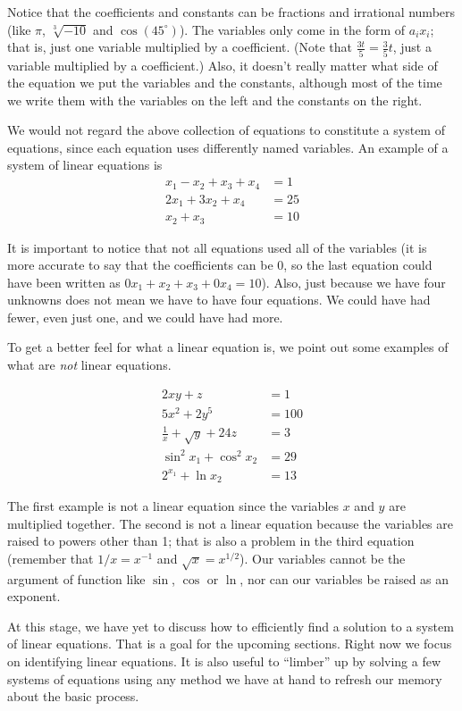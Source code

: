 Notice that the coefficients and constants can be fractions and irrational numbers (like $\pi$, $\sqrt[3]{-10}$ and $\cos(45^\circ)$). The variables only come in the form of $a_ix_i$; that is, just one variable multiplied by a coefficient. (Note that $\frac{3t}{5} = \frac35t$, just a variable multiplied by a coefficient.) Also, it doesn't really matter what side of the equation we put the variables and the constants, although most of the time we write them with the variables on the left and the constants on the right. 

We would not regard the above collection of equations to constitute a system of equations, since each equation uses differently named variables. An example of a system of linear equations is 
\begin{align*}
x_1-x_2+x_3+x_4&=1\\
2x_1+3x_2+x_4 &= 25\\
x_2+x_3&=10
\end{align*}

It is important to notice that not all equations used all of the variables (it is more accurate to say that the coefficients can be 0, so the last equation could have been written as $0x_1+x_2+x_3+0x_4 = 10$). Also, just because we have four unknowns does not mean we have to have four equations. We could have had fewer, even just one, and we could have had more.

To get a better feel for what a linear equation is, we point out some examples of what are {\em not} linear equations.

\begin{align*}
2xy+z&=1\\
5x^2+2y^5&=100\\
\frac1x+\sqrt{y}+24z&=3\\
\sin^2x_1+\cos^2x_2 &= 29\\
2^{x_1} + \ln x_2 &= 13
\end{align*}

The first example is not a linear equation since the variables $x$ and $y$ are multiplied together. The second is not a linear equation because the variables are raised to powers other than 1; that is also a problem in the third equation (remember that $1/x = x^{-1}$ and $\sqrt{x} = x^{1/2}$). Our variables cannot be the argument of function like $\sin$, $\cos$ or $\ln$, nor can our variables be raised as an exponent. 

At this stage, we have yet to discuss how to efficiently find a solution to a system of linear equations. That is a goal for the upcoming sections. Right now we focus on identifying linear equations. It is also useful to ``limber'' up by solving a few systems of equations using any method we have at hand to refresh our memory about the basic process.\\





